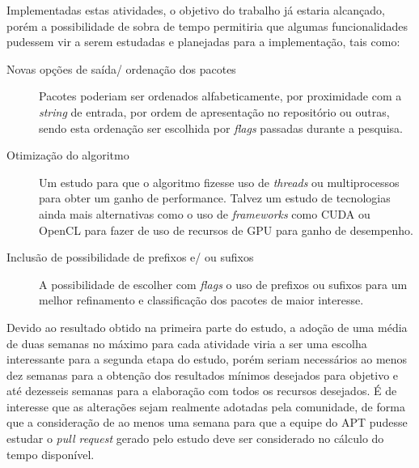 Implementadas estas atividades, o objetivo do trabalho já estaria alcançado, porém a possibilidade de sobra de tempo permitiria que algumas funcionalidades pudessem vir a serem estudadas e planejadas para a implementação, tais como:

\begin{description}
	\item [Novas opções de saída/ ordenação dos pacotes] Pacotes poderiam ser ordenados alfabeticamente, por proximidade com a \textit{string} de entrada, por ordem de apresentação no repositório ou outras, sendo esta ordenação ser escolhida por \textit{flags} passadas durante a pesquisa.
	\item [Otimização do algoritmo] Um estudo para que o algoritmo fizesse uso de \textit{threads} ou multiprocessos para obter um ganho de performance. Talvez um estudo de tecnologias ainda mais alternativas como o uso de \textit{frameworks} como CUDA ou OpenCL para fazer de uso de recursos de GPU para ganho de desempenho.
	\item [Inclusão de possibilidade de prefixos e/ ou sufixos] A possibilidade de escolher com \textit{flags} o uso de prefixos ou sufixos para um melhor refinamento e classificação dos pacotes de maior interesse.
\end{description}

Devido ao resultado obtido na primeira parte do estudo, a adoção de uma média de duas semanas no máximo para cada atividade viria a ser uma escolha interessante para a segunda etapa do estudo, porém seriam necessários ao menos dez semanas para a obtenção dos resultados mínimos desejados para objetivo e até dezesseis semanas para a elaboração com todos os recursos desejados. É de interesse que as alterações sejam realmente adotadas pela comunidade, de forma que a consideração de ao menos uma semana para que a equipe do APT pudesse estudar o \textit{pull request} gerado pelo estudo deve ser considerado no cálculo do tempo disponível.


